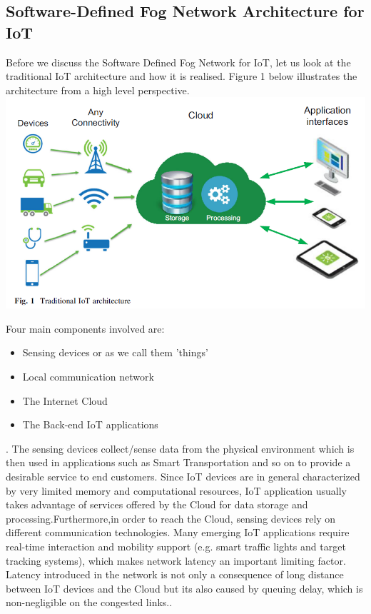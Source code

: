 \documentclass{article}
\begin{document}
\subsection{Software-Defined Fog Network Architecture for IoT}

Before we discuss the Software Defined Fog Network for IoT, let us look at the traditional IoT architecture and how it is realised.
Figure 1 below\cite{tomovic2017software} illustrates the architecture from a high level perspective. 
\includegraphics[scale=0.7]{iot.png}

Four main components involved are\cite{tomovic2017software}: 
\begin{itemize}
\item Sensing devices or as we call them 'things'
\item Local communication network
\item The Internet Cloud
\item The Back-end IoT applications
\end{itemize}. 
The sensing devices collect/sense data from the physical environment which is then used in applications such as Smart Transportation and so on to provide a desirable service to end customers. 
Since IoT devices are in general characterized by very limited memory and computational resources, IoT application usually takes advantage of services offered by the Cloud for data storage and processing.Furthermore,in order to reach the Cloud, sensing devices rely on different communication technologies\cite{tomovic2017software}. 
Many emerging IoT applications require real-time interaction and mobility support (e.g. smart traffic lights and target tracking systems), which makes network latency an important limiting factor. Latency introduced in the network is not only a consequence of long distance between IoT devices and the Cloud but its also caused by queuing delay, which is non-negligible on the congested links.\cite{tomovic2017software}. 
\end{document}
